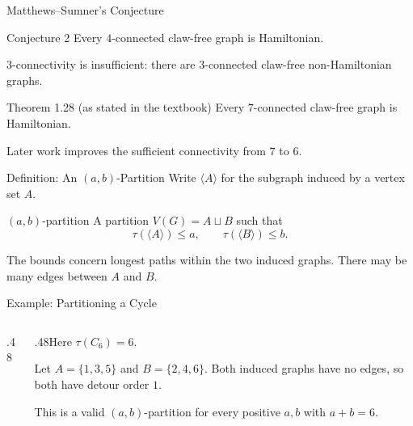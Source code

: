 \documentclass[aspectratio=169,11pt]{beamer}
\begin{document}
\begin{frame}{Matthews--Sumner's Conjecture}
\large
\begin{block}{Conjecture 2}
Every $4$-connected claw-free graph is Hamiltonian.
\end{block}
\medskip $3$-connectivity is insufficient: there are $3$-connected claw-free non-Hamiltonian graphs.\begin{block}{Theorem 1.28 (as stated in the textbook)}
Every $7$-connected claw-free graph is Hamiltonian.
\end{block}
\small\medskip Later work improves the sufficient connectivity from $7$ to $6$.\par{}
\end{frame}

\begin{frame}{Definition: An $(a,b)$-Partition}
\large
Write $\langle A\rangle$ for the subgraph induced by a vertex set $A$.\begin{block}{$(a,b)$-partition}
A partition $V(G)=A\sqcup B$ such that\[\tau(\langle A\rangle)\le a,\qquad\tau(\langle B\rangle)\le b.\]
\end{block}
\medskip The bounds concern longest paths within the two induced graphs. There may be many edges between $A$ and $B$.
\end{frame}

\begin{frame}{Example: Partitioning a Cycle}
\large
\begin{columns}[c,onlytextwidth]\begin{column}{.48\textwidth}\begin{center}\end{center}\end{column}\begin{column}{.48\textwidth}Here $\tau(C_6)=6$.\par\medskip Let $A=\{1,3,5\}$ and $B=\{2,4,6\}$. Both induced graphs have no edges, so both have detour order $1$.\par\medskip This is a valid $(a,b)$-partition for every positive $a,b$ with $a+b=6$.\end{column}\end{columns}
\end{frame}
\end{document}
